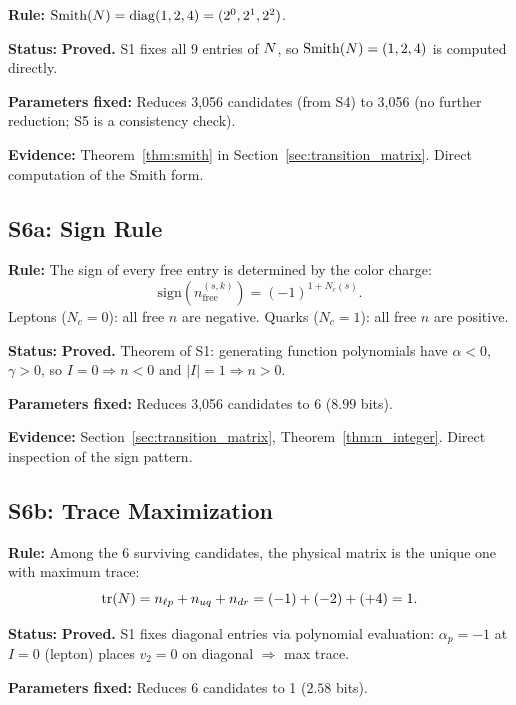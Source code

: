 \textbf{Rule:} $\mathrm{Smith}(N) = \mathrm{diag}(1, 2, 4) = (2^0, 2^1, 2^2)$.

\textbf{Status:} \textbf{Proved.} S1 fixes all 9 entries of $N$, so $\mathrm{Smith}(N) = (1, 2, 4)$ is computed directly.

\textbf{Parameters fixed:} Reduces 3,056 candidates (from S4) to 3,056 (no further reduction; S5 is a consistency check).

\textbf{Evidence:} Theorem~\ref{thm:smith} in Section~\ref{sec:transition_matrix}. Direct computation of the Smith form.

\subsection{S6a: Sign Rule}\label{app:s6a}

\textbf{Rule:} The sign of every free entry is determined by the color charge:
\begin{equation}
\mathrm{sign}(n_{\mathrm{free}}^{(s,k)}) = (-1)^{1+N_c(s)}.
\end{equation}
Leptons ($N_c = 0$): all free $n$ are negative. Quarks ($N_c = 1$): all free $n$ are positive.

\textbf{Status:} \textbf{Proved.} Theorem of S1: generating function polynomials have $\alpha < 0$, $\gamma > 0$, so $I = 0 \Rightarrow n < 0$ and $|I| = 1 \Rightarrow n > 0$.

\textbf{Parameters fixed:} Reduces 3,056 candidates to 6 ($8.99$ bits).

\textbf{Evidence:} Section~\ref{sec:transition_matrix}, Theorem~\ref{thm:n_integer}. Direct inspection of the sign pattern.

\subsection{S6b: Trace Maximization}\label{app:s6b}

\textbf{Rule:} Among the 6 surviving candidates, the physical matrix is the unique one with maximum trace:
\begin{equation}
\mathrm{tr}(N) = n_{\ell p} + n_{uq} + n_{dr} = (-1) + (-2) + (+4) = 1.
\end{equation}

\textbf{Status:} \textbf{Proved.} S1 fixes diagonal entries via polynomial evaluation: $\alpha_p = -1$ at $I = 0$ (lepton) places $v_2 = 0$ on diagonal $\Rightarrow$ max trace.

\textbf{Parameters fixed:} Reduces 6 candidates to 1 ($2.58$ bits).

